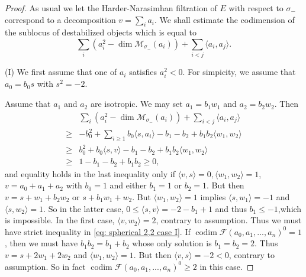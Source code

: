 \documentclass[leqno,11pt]{amsart}
\def\codim{\mathop{\mathrm{codim}}\nolimits}
\def\dim{\mathop{\mathrm{dim}}\nolimits}
\theoremstyle{definition}
\def\FF{\ensuremath{\mathcal F}}
\def\MM{\ensuremath{\mathcal M}}
\begin{document}
\begin{proof}  As usual we let the Harder-Narasimhan filtration of $E$ with respect to $\sigma_-$ correspond to a decomposition $v=\sum_i a_i$.  We shall estimate the codimension of the sublocus of destabilized objects which is equal to
 \begin{equation}
\sum_i (a_i^2-\dim \MM_{\sigma_-}(a_i))+\sum_{i<j}\langle a_i,a_j \rangle.
\end{equation}


(I) We first assume that one of $a_i$ satisfies $a_i^2<0$.
For simpicity, we assume that $a_0=b_0 s$ with $s^2=-2$.

Assume that $a_1$ and $a_2$ are isotropic.
We may set $a_1=b_1 w_1$ and $a_2=b_2 w_2$.
Then 
 \begin{equation}\label{eq: spherical 2,2 case I}
\begin{split}
& \sum_i (a_i^2-\dim \MM_{\sigma_-}(a_i))+\sum_{i<j}\langle a_i,a_j \rangle\\
\geq & -b_0^2+\sum_{i \geq 1}b_0 \langle s,a_i \rangle
-b_1-b_2+b_1 b_2 \langle w_1,w_2 \rangle\\
\geq & b_0^2+b_0 \langle s,v \rangle-b_1-b_2+b_1 b_2 \langle w_1,w_2 \rangle \\
\geq & 1-b_1-b_2+b_1 b_2 \geq 0,
\end{split}
\end{equation} 
 and equality holds in the last inequality only if $\langle v, s\rangle=0,\langle w_1,w_2\rangle=1$, $v=a_0+a_1+a_2$ with $b_0=1$ and either $b_1=1$ or $b_2=1$.  But then $v=s+w_1+b_2 w_2$ or $s+b_1 w_1+w_2$.  But $\langle w_1,w_2\rangle=1$ implies $\langle s,w_1\rangle =-1$ and $\langle s,w_2\rangle=1$.  So in the latter case, $0\leq\langle s,v\rangle=-2-b_1+1$ and thus $b_1\leq -1$,which is impossible.  In the first case, $\langle v,w_2\rangle=2$, contrary to assumption.  Thus we must have strict inequality in \eqref{eq: spherical 2,2 case I}.  If $\codim\FF(a_0,a_1,...,a_n)^0=1$, then we must have $b_1 b_2=b_1+b_2$ whose only solution is $b_1=b_2=2$.  Thus $v=s+2w_1+2w_2$ and $\langle w_1,w_2\rangle=1$.  But then $\langle v,s\rangle=-2<0$, contrary to assumption.  So in fact $\codim\FF(a_0,a_1,...,a_n)^0\geq 2$ in this case.



\end{proof}
\end{document}
